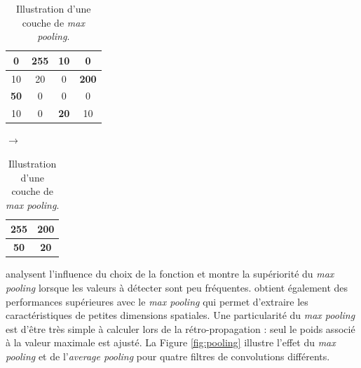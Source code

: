 \begin{table}[hbtp]
	\centering
	\begin{tabular}{|c|c||c|c|}
		\hline
		0 & \textbf{255} &          10 &            0 \\ \hline
		10 &           20 &           0 & \textbf{200} \\ \hline \hline
		\textbf{50} &            0 &           0 &            0 \\ \hline
		10 &            0 & \textbf{20} &           10 \\ \hline
	\end{tabular}
	\quad
	$\rightarrow$
	\quad
	\begin{tabular}{|c||c|}
		\hline
		\textbf{255} & \textbf{200} \\ \hline \hline
		\textbf{50}  & \textbf{20}  \\ \hline
	\end{tabular}
	\caption{Illustration d'une couche de \emph{max pooling}.}
	\label{tab:maxpooling}
\end{table}

\citeauthor{boureau_theoretical_2010} \cite{boureau_theoretical_2010} analysent l'influence du choix de la fonction et montre la supériorité du \textit{max pooling} lorsque les valeurs à détecter sont peu fréquentes.
\citeauthor{scherer_evaluation_2010} \cite{scherer_evaluation_2010} obtient également des performances supérieures avec le \textit{max pooling} qui permet d'extraire les caractéristiques de petites dimensions spatiales.
Une particularité du \textit{max pooling} est d'être très simple à calculer lors de la rétro-propagation : seul le poids associé à la valeur maximale est ajusté.
La Figure \ref{fig:pooling} illustre l'effet du \textit{max pooling} et de l'\textit{average pooling} pour quatre filtres de convolutions différents.

